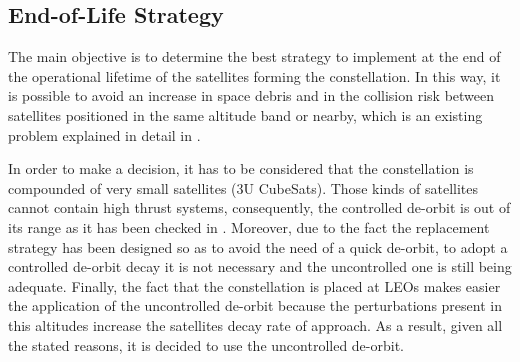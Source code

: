 \subsection{End-of-Life Strategy}
The main objective is to determine the best strategy to implement at the end of the operational lifetime of the satellites forming the constellation. In this way, it is possible to avoid an increase in space debris and in the collision risk between satellites positioned in the same altitude band or nearby, which is an existing problem explained in detail in \cite[Chapter 1, Section 2]{annex2}.

In order to make a decision, it has to be considered that the constellation is compounded of very small satellites (3U CubeSats). Those kinds of satellites cannot contain high thrust systems, consequently, the controlled de-orbit is out of its range as it has been checked in  \cite[Chapter 1, Section 4]{annex2}. Moreover, due to the fact the replacement strategy has been designed so as to avoid the need of a quick de-orbit, to adopt a controlled de-orbit decay it is not necessary and the uncontrolled one is still being adequate. Finally, the fact that the constellation is placed at LEOs makes easier the application of the uncontrolled de-orbit because the perturbations present in this altitudes increase the satellites decay rate of approach. As a result, given all the stated reasons, it is decided to use the uncontrolled de-orbit. 